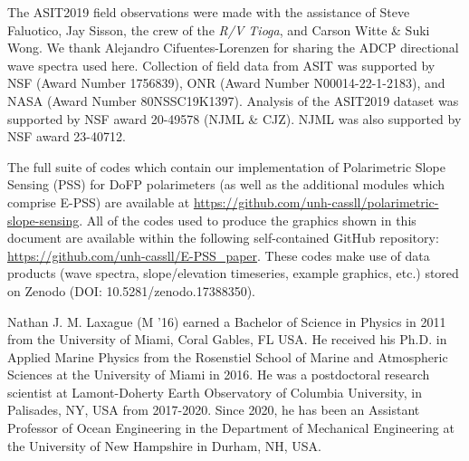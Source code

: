 \documentclass[letterpaper,journal]{IEEEtran}
\begin{document}
The ASIT2019 field observations were made with the assistance of Steve Faluotico, Jay Sisson, the crew of the \textit{R/V Tioga}, and Carson Witte \& Suki Wong. We thank Alejandro Cifuentes-Lorenzen for sharing the ADCP directional wave spectra used here. Collection of field data from ASIT was supported by NSF (Award Number 1756839), ONR (Award Number N00014-22-1-2183), and NASA (Award Number 80NSSC19K1397). Analysis of the ASIT2019 dataset was supported by NSF award 20-49578 (NJML \& CJZ). NJML was also supported by NSF award 23-40712.

The full suite of codes which contain our implementation of Polarimetric Slope Sensing (PSS) for DoFP polarimeters (as well as the additional modules which comprise E-PSS) are available at \url{https://github.com/unh-cassll/polarimetric-slope-sensing}. All of the codes used to produce the graphics shown in this document are available within the following self-contained GitHub repository: \url{https://github.com/unh-cassll/E-PSS_paper}. These codes make use of data products (wave spectra, slope/elevation timeseries, example graphics, etc.) stored on Zenodo (DOI: 10.5281/zenodo.17388350).






\begin{IEEEbiography}{Nathan J. M. Laxague}
(M '16) earned a Bachelor of Science in Physics in 2011 from the University of Miami, Coral Gables, FL USA. He received his Ph.D. in Applied Marine Physics from the Rosenstiel School of Marine and Atmospheric Sciences at the University of Miami in 2016. He was a postdoctoral research scientist at Lamont-Doherty Earth Observatory of Columbia University, in Palisades, NY, USA from 2017-2020. Since 2020, he has been an Assistant Professor of Ocean Engineering in the Department of Mechanical Engineering at the University of New Hampshire in Durham, NH, USA.
\end{IEEEbiography}
\end{document}

